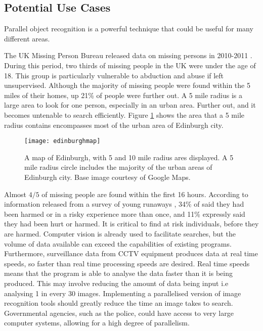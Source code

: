 \documentclass[../main.tex]{subfiles}
\begin{document}
    \subsection{Potential Use Cases}
    Parallel object recognition is a powerful technique that could be useful for many different areas.

    The UK Missing Person Bureau released data on missing persons in 2010-2011 \cite{missingpersons}.
    During this period, two thirds of missing people in the UK were under the age of 18.
    This group is particularly vulnerable to abduction and abuse if left unsupervised.
    Although the majority of missing people were found within the 5 miles of their homes, up 21\% of people were further out.
    A 5 mile radius is a large area to look for one person, especially in an urban area.
    Further out, and it becomes untenable to search efficiently.
    Figure \ref{edimap} shows the area that a 5 mile radius contains encompasses most of the urban area of Edinburgh city.
    \begin{figure}[h]
      \centering
      \texttt{[image: edinburghmap]}
      \caption[A map of Edinburgh]{A map of Edinburgh, with 5 and 10 mile radius ares displayed. A 5 mile radius circle includes the majority of the urban areas of Edinburgh city. Base image courtesy of Google Maps.}
      \label{edimap}
    \end{figure}
    Almost $4/5$ of missing people are found within the first 16 hours.
    According to information released from a survey of young runaways \cite{stillrunning}, 34\% of said they had been harmed or in a risky experience more than once,  and 11\% expressly said they had been hurt or harmed.
    It is critical to find at risk individuals, before they are harmed.
    Computer vision is already used to facilitate searches, but the volume of data available can exceed the capabilities of existing programs. %
    Furthermore, surveillance data from CCTV equipment produces data at real time speeds, so faster than real time processing speeds are desired.
    Real time speeds means that the program is able to analyse the data faster than it is being produced.
    This may involve reducing the amount of data being input i.e analysing 1 in every 30 images.
    Implementing a parallelised version of image recognition tools should greatly reduce the time an image takes to search.
    Governmental agencies, such as the police, could have access to very large computer systems, allowing for a high degree of parallelism.
\end{document}
